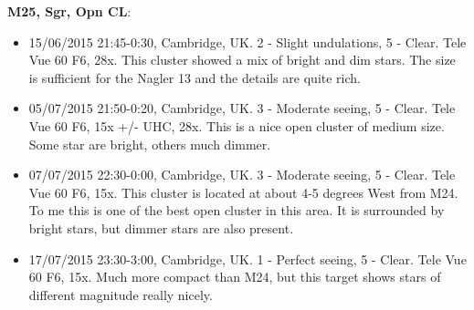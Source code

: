 {\bf M25, Sgr, Opn CL}:
\begin{itemize}
\item 15/06/2015 21:45-0:30, Cambridge, UK. 2 - Slight undulations, 5 - Clear. Tele Vue 60 F6, 28x. This cluster showed a mix of bright and dim stars. The size is sufficient for the Nagler 13 and the details are quite rich.
\item 05/07/2015 21:50-0:20, Cambridge, UK. 3 - Moderate seeing, 5 - Clear. Tele Vue 60 F6, 15x +/- UHC, 28x. This is a nice open cluster of medium size. Some star are bright, others much dimmer.
\item 07/07/2015 22:30-0:00, Cambridge, UK. 3 - Moderate seeing, 5 - Clear. Tele Vue 60 F6, 15x. This cluster is located at about 4-5 degrees West from M24. To me this is one of the best open cluster in this area. It is surrounded by bright stars, but dimmer stars are also present.
\item 17/07/2015 23:30-3:00, Cambridge, UK. 1 - Perfect seeing, 5 - Clear. Tele Vue 60 F6, 15x. Much more compact than M24, but this target shows stars of different magnitude really nicely.
\end{itemize}
